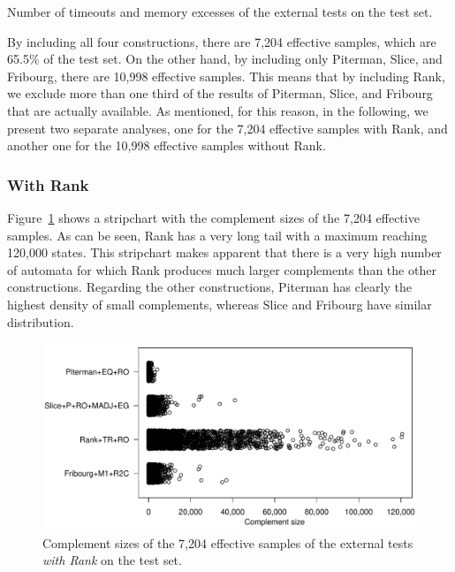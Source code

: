 \begin{table}[ht]
\centering

\caption{Number of timeouts and memory excesses of the external tests on the \goal{} test set.}
\label{e.g.outs}
\end{table}

By including all four constructions, there are 7,204 effective samples, which are 65.5\% of the test set. On the other hand, by including only Piterman, Slice, and Fribourg, there are 10,998 effective samples. This means that by including Rank, we exclude more than one third of the results of Piterman, Slice, and Fribourg that are actually available. As mentioned, for this reason, in the following, we present two separate analyses, one for the 7,204 effective samples with Rank, and another one for the 10,998 effective samples without Rank.

\subsubsection{With Rank}
Figure~\ref{e.g.stripchart.with_rank} shows a stripchart with the complement sizes of the 7,204 effective samples. As can be seen, Rank has a very long tail with a maximum reaching 120,000 states. This stripchart makes apparent that there is a very high number of automata for which Rank produces much larger complements than the other constructions. Regarding the other constructions, Piterman has clearly the highest density of small complements, whereas Slice and Fribourg have similar distribution.

\begin{figure}[htb]
\centering
\includegraphics[scale=0.575]{figures/r/external/goal/s.stripchart.with_rank.pdf}
\caption{Complement sizes of the 7,204 effective samples of the external tests \textit{with Rank} on the \goal{} test set.}
\label{e.g.stripchart.with_rank}
\end{figure}

